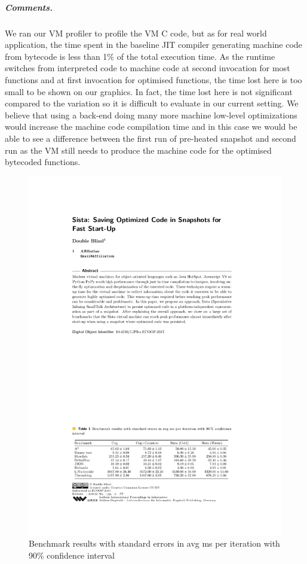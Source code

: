 \documentclass[a4paper,12pt,twoside]{../includes/ThesisStyle}
\begin{document}
\subparagraph{Comments.}

We ran our VM profiler to profile the VM C code, but as for real world application, the time spent in the baseline JIT compiler generating machine code from bytecode is less than 1\% of the total execution time. As the runtime switches from interpreted code to machine code at second invocation for most functions and at first invocation for optimised functions, the time lost here is too small to be shown on our graphics. In fact, the time lost here is not significant compared to the variation so it is difficult to evaluate in our current setting. We believe that using a back-end doing many more machine low-level optimizations would increase the machine code compilation time and in this case we would be able to see a difference between the first run of pre-heated snapshot and second run as the VM still needs to produce the machine code for the optimised bytecoded functions.

\begin{figure}[h!]
    \begin{center}
        \includegraphics[width=\linewidth]{BenchTable}
        \caption{Benchmark results with standard errors in avg ms per iteration with 90\% confidence interval}
        \label{tbl:benchmark}
    \end{center}
\end{figure}
\end{document}
